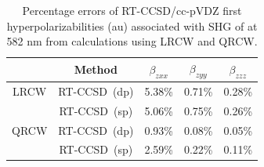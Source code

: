 \begin{table}
  \centering
    \caption{Percentage errors of RT-CCSD/cc-pVDZ first hyperpolarizabilities (au) associated with SHG of  at 582 nm from calculations using LRCW and QRCW.}
  \begin{tabular}{c|c|ccc}
                                        &  \textrm{Method}  & $\beta_{zxx}$ & $\beta_{zyy}$ & $\beta_{zzz}$ \\
                                          \hline                   
     \textrm{LRCW} & \textrm{RT-CCSD\ (dp)} & 5.38\% & 0.71\% &  0.28\%  \\
                              & \textrm{RT-CCSD\ (sp)} & 5.06\% & 0.75\% & 0.26\%  \\
    \hline
     \textrm{QRCW} & \textrm{RT-CCSD\ (dp)} & 0.93\% & 0.08\% &  0.05\%  \\
                              & \textrm{RT-CCSD\ (sp)} & 2.59\% & 0.22\% & 0.11\%  \\
     \end{tabular}
      \label{tab:hyp-shg-error}
\end{table}
